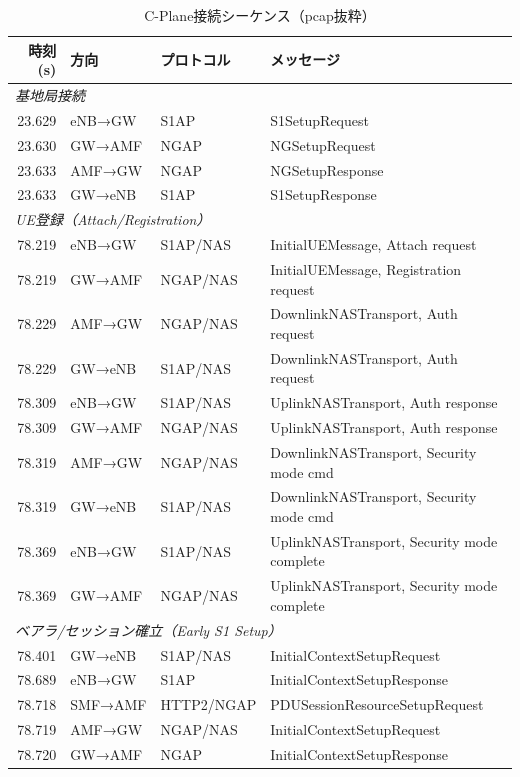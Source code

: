 \begin{table}[htbp]
\centering
\caption{C-Plane接続シーケンス（pcap抜粋）}
\label{tab:pcap_sequence}
\small
\begin{tabular}{|r|l|l|l|}
\hline
\textbf{時刻(s)} & \textbf{方向} & \textbf{プロトコル} & \textbf{メッセージ} \\
\hline
\hline
\multicolumn{4}{|l|}{\textit{基地局接続}} \\
\hline
23.629 & eNB→GW & S1AP & S1SetupRequest \\
23.630 & GW→AMF & NGAP & NGSetupRequest \\
23.633 & AMF→GW & NGAP & NGSetupResponse \\
23.633 & GW→eNB & S1AP & S1SetupResponse \\
\hline
\multicolumn{4}{|l|}{\textit{UE登録（Attach/Registration）}} \\
\hline
78.219 & eNB→GW & S1AP/NAS & InitialUEMessage, Attach request \\
78.219 & GW→AMF & NGAP/NAS & InitialUEMessage, Registration request \\
78.229 & AMF→GW & NGAP/NAS & DownlinkNASTransport, Auth request \\
78.229 & GW→eNB & S1AP/NAS & DownlinkNASTransport, Auth request \\
78.309 & eNB→GW & S1AP/NAS & UplinkNASTransport, Auth response \\
78.309 & GW→AMF & NGAP/NAS & UplinkNASTransport, Auth response \\
78.319 & AMF→GW & NGAP/NAS & DownlinkNASTransport, Security mode cmd \\
78.319 & GW→eNB & S1AP/NAS & DownlinkNASTransport, Security mode cmd \\
78.369 & eNB→GW & S1AP/NAS & UplinkNASTransport, Security mode complete \\
78.369 & GW→AMF & NGAP/NAS & UplinkNASTransport, Security mode complete \\
\hline
\multicolumn{4}{|l|}{\textit{ベアラ/セッション確立（Early S1 Setup）}} \\
\hline
78.401 & GW→eNB & S1AP/NAS & InitialContextSetupRequest \\
78.689 & eNB→GW & S1AP & InitialContextSetupResponse \\
78.718 & SMF→AMF & HTTP2/NGAP & PDUSessionResourceSetupRequest \\
78.719 & AMF→GW & NGAP/NAS & InitialContextSetupRequest \\
78.720 & GW→AMF & NGAP & InitialContextSetupResponse \\
\hline
\end{tabular}
\end{table}


